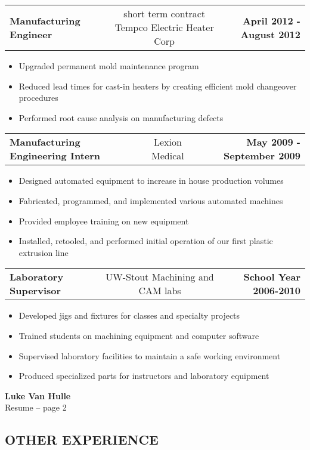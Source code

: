 \documentclass[11pt,letterpaper]{article}
\makeatletter
\newcommand{\headerrow}[3]
{\vspace{0.4em}
\noindent
\begin{tabular*}{\textwidth}{l @{\extracolsep{\fill}} cr}
	\textbf{#1} & %
	#2 &		  %
	\textbf{#3}\\ %
\end{tabular*}}
\makeatother
\begin{document}
	\headerrow
		{Manufacturing Engineer}
		{short term contract Tempco Electric Heater Corp}
		{April 2012 - August 2012}
	\begin{itemize}
		\item Upgraded permanent mold maintenance program
		\item Reduced lead times for cast-in heaters by creating efficient mold changeover procedures
		\item Performed root cause analysis on manufacturing defects
	\end{itemize}

	\headerrow
		{Manufacturing Engineering Intern}
		{Lexion Medical}
		{May 2009 - September 2009}
	\begin{itemize}
		\item Designed automated equipment to increase in house production volumes
		\item Fabricated, programmed, and implemented various automated machines
		\item Provided employee training on new equipment
		\item Installed, retooled, and performed initial operation of our first plastic extrusion line
	\end{itemize}

	\headerrow
		{Laboratory Supervisor}
		{UW-Stout Machining and CAM labs}
		{School Year 2006-2010}
	\begin{itemize}
		\item Developed jigs and fixtures for classes and specialty projects
		\item Trained students on machining equipment and computer software
		\item Supervised laboratory facilities to maintain a safe working environment
		\item Produced specialized parts for instructors and laboratory equipment
	\end{itemize}
	
\pagebreak %
\thispagestyle{empty} %

\begin{center}
	\LARGE \textbf{Luke Van Hulle} \\
	\normalsize Resume -- page 2
\end{center}

\subsection*{OTHER EXPERIENCE}
\end{document}
